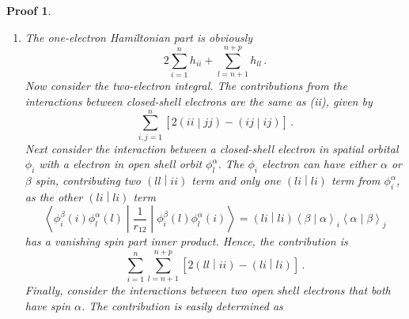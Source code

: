 \documentclass{article}
\theoremstyle{plain}\theoremheaderfont{\normalfont\itshape}\theorembodyfont{\rmfamily}\theoremseparator{.}\newtheorem*{rem}{Remark}\newtheorem*{ex}{Example}\newtheorem*{proof}{Proof}\newtheorem*{altp}{Alternative proof}
\theoremstyle{plain}\theoremheaderfont{\normalfont\bfseries}\theorembodyfont{\rmfamily}\theoremseparator{.}\newtheorem{thm}{Theorem}[section]\newtheorem{lem}[thm]{Lemma}\newtheorem{prop}[thm]{Proposition}\newtheorem*{cor}{Corollary}\newtheorem{defn}[thm]{Definition}\newtheorem{clm}[thm]{Claim}\newtheorem{clminproof}{Claim}
\theoremstyle{break}\theoremheaderfont{\normalfont\itshape}\theorembodyfont{\rmfamily}\theoremseparator{.\medskip}\newtheorem*{proofskip}{Proof}\newtheorem*{exs}{Examples}\newtheorem*{rems}{Remarks}
\theoremstyle{break}\theoremheaderfont{\normalfont\bfseries}\theorembodyfont{\rmfamily}\theoremseparator{.\medskip}\newtheorem{lemskip}[thm]{Lemma}\newtheorem{defnskip}[thm]{Definition}\newtheorem{propskip}[thm]{Proposition}\newtheorem{thmskip}[thm]{Theorem}
\numberwithin{equation}{section}
\newcommand{\braket}[2]{\left\langle #1 \middle| #2 \right\rangle}
\newcommand{\mel}[3]{\left\langle #1 \middle| #2 \middle| #3 \right\rangle}
\newcommand{\bracket}[2]{\left( #1 \middle| #2 \right)}
\begin{document}
\begin{proofskip}
\begin{enumerate}[topsep=0pt,label=(\roman*)]
\begin{itemize}
                \begin{equation}
                    \braket{\alpha}{\beta}_i\braket{\alpha}{\beta}_j\text{ and }\braket{\beta}{\alpha}_i\braket{\beta}{\alpha}_j\,.
                \end{equation}
                \item for the special case where \(i=j\), we get two contributions in total, which are \(\bracket{\phi_i^\alpha\phi_i^\alpha}{\phi_i^\beta\phi_i^\beta}\) and \(\bracket{\phi_i^\beta\phi_i^\beta}{\phi_i^\alpha\phi_i^\alpha}\).
            \end{itemize}
            Hence we get the expression
            \begin{equation}
                E=2\sum_{i}^{n}h_{ii}+\sum_{i,j}^{n}[2\bracket{ii}{jj}-\bracket{ij}{ij}]\,.
            \end{equation}
            \item The one-electron Hamiltonian part is obviously
            \begin{equation}
                2\sum_{i=1}^{n}h_{ii}+\sum_{l=n+1}^{n+p}h_{ll}\,.
            \end{equation}
            Now consider the two-electron integral. The contributions from the interactions between closed-shell electrons are the same as (ii), given by
            \begin{equation}
                \sum_{i,j=1}^{n}[2\bracket{ii}{jj}-\bracket{ij}{ij}]\,.
            \end{equation}
            Next consider the interaction between a closed-shell electron in spatial orbital \(\phi_i\) with a electron in open shell orbit \(\phi_l^\alpha\). The \(\phi_i\) electron can have either \(\alpha\) or \(\beta\) spin, contributing two \(\bracket{ll}{ii}\) term and only one \(\bracket{li}{li}\) term from \(\phi_i^\alpha\), as the other \(\bracket{li}{li}\) term
            \begin{equation}
                \mel{\phi_i^\beta(i)\phi_l^\alpha(l)}{\frac{1}{r_{12}}}{\phi_i^\beta(l)\phi_l^\alpha(i)}=\bracket{li}{li}\braket{\beta}{\alpha}_i\braket{\alpha}{\beta}_j
            \end{equation}
            has a vanishing spin part inner product. Hence, the contribution is
            \begin{equation}
                \sum_{i=1}^{n}\sum_{l=n+1}^{n+p}[2\bracket{ll}{ii}-\bracket{li}{li}]\,.
            \end{equation}
            Finally, consider the interactions between two open shell electrons that both have spin \(\alpha\). The contribution is easily determined as

\end{enumerate}
\end{proofskip}
\end{document}
